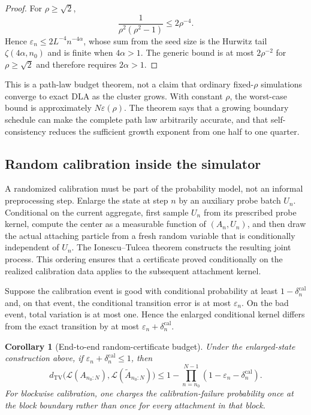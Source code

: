 \documentclass[11pt]{article}
\theoremstyle{mainthm}
\newtheorem{corollary}[corollary]{Corollary}
\theoremstyle{definition}
\theoremstyle{remark}
\newcommand{\Law}{\mathcal L}
\newcommand{\dTV}{d_{\mathrm{TV}}}
\newcommand{\eps}{\varepsilon}
\begin{document}
\begin{proof}
For $\rho\ge\sqrt2$,
\[
  \frac{1}{\rho^2(\rho^2-1)}\le2\rho^{-4}.
\]
Hence $\eps_n\le2L^{-4}n^{-4\alpha}$, whose sum from the seed size is the Hurwitz tail $\zeta(4\alpha,n_0)$ and is finite when $4\alpha>1$. The generic bound is at most $2\rho^{-2}$ for $\rho\ge\sqrt2$ and therefore requires $2\alpha>1$.
\end{proof}

\begin{cautionbox}
This is a path-law budget theorem, not a claim that ordinary fixed-$\rho$ simulations converge to exact DLA as the cluster grows. With constant $\rho$, the worst-case bound is approximately $N\eps(\rho)$. The theorem says that a growing boundary schedule can make the complete path law arbitrarily accurate, and that self-consistency reduces the sufficient growth exponent from one half to one quarter.
\end{cautionbox}

\subsection{Random calibration inside the simulator}

A randomized calibration must be part of the probability model, not an informal preprocessing step. Enlarge the state at step $n$ by an auxiliary probe batch $U_n$. Conditional on the current aggregate, first sample $U_n$ from its prescribed probe kernel, compute the center as a measurable function of $(A_n,U_n)$, and then draw the actual attaching particle from a fresh random variable that is conditionally independent of $U_n$. The Ionescu--Tulcea theorem constructs the resulting joint process. This ordering ensures that a certificate proved conditionally on the realized calibration data applies to the subsequent attachment kernel.

Suppose the calibration event is good with conditional probability at least $1-\delta_n^{\mathrm{cal}}$ and, on that event, the conditional transition error is at most $\eps_n$. On the bad event, total variation is at most one. Hence the enlarged conditional kernel differs from the exact transition by at most $\eps_n+\delta_n^{\mathrm{cal}}$.

\begin{corollary}[End-to-end random-certificate budget]
\label{cor:random-calibration}
Under the enlarged-state construction above, if $\eps_n+\delta_n^{\mathrm{cal}}\le1$, then
\[
  \dTV\bigl(\Law(A_{n_0:N}),\Law(\widetilde A_{n_0:N})\bigr)
  \le1-\prod_{n=n_0}^{N-1}(1-\eps_n-\delta_n^{\mathrm{cal}}).
\]
For blockwise calibration, one charges the calibration-failure probability once at the block boundary rather than once for every attachment in that block.
\end{corollary}
\end{document}
